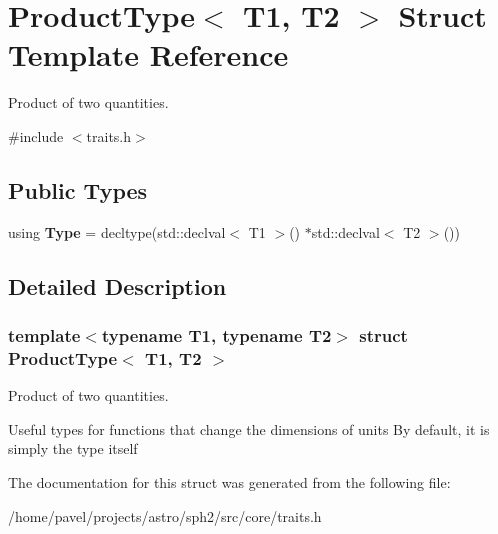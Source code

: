 \hypertarget{structProductType}{}\section{Product\+Type$<$ T1, T2 $>$ Struct Template Reference}
\label{structProductType}


Product of two quantities.  




{\ttfamily \#include $<$traits.\+h$>$}

\subsection*{Public Types}
\begin{DoxyCompactItemize}
\item 
\hypertarget{structProductType_a55d10db50cc27a747a2c42cf6b33201d}{}\label{structProductType_a55d10db50cc27a747a2c42cf6b33201d} 
using {\bfseries Type} = decltype(std\+::declval$<$ T1 $>$() $\ast$std\+::declval$<$ T2 $>$())
\end{DoxyCompactItemize}


\subsection{Detailed Description}
\subsubsection*{template$<$typename T1, typename T2$>$\newline
struct Product\+Type$<$ T1, T2 $>$}

Product of two quantities. 

Useful types for functions that change the dimensions of units By default, it is simply the type itself 

The documentation for this struct was generated from the following file\+:\begin{DoxyCompactItemize}
\item 
/home/pavel/projects/astro/sph2/src/core/traits.\+h\end{DoxyCompactItemize}
